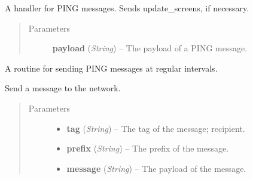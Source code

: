 \documentclass[letterpaper,10pt,english]{sphinxmanual}
\begin{document}
\begin{fulllineitems}
\begin{fulllineitems}
\label{swnp:swnp.SWNP.ping_handler}
A handler for PING messages. Sends update\_screens, if necessary.
\begin{quote}\begin{description}
\item[{Parameters}] \leavevmode
\textbf{payload} (\emph{String}) -- The payload of a PING message.

\end{description}\end{quote}

\end{fulllineitems}


\begin{fulllineitems}
\label{swnp:swnp.SWNP.ping_routine}
A routine for sending PING messages at regular intervals.

\end{fulllineitems}


\begin{fulllineitems}
\label{swnp:swnp.SWNP.send}
Send a message to the network.
\begin{quote}\begin{description}
\item[{Parameters}] \leavevmode\begin{itemize}
\item {} 
\textbf{tag} (\emph{String}) -- The tag of the message; recipient.

\item {} 
\textbf{prefix} (\emph{String}) -- The prefix of the message.

\item {} 
\textbf{message} (\emph{String}) -- The payload of the message.

\end{itemize}

\end{description}\end{quote}

\end{fulllineitems}



\end{fulllineitems}
\end{document}
